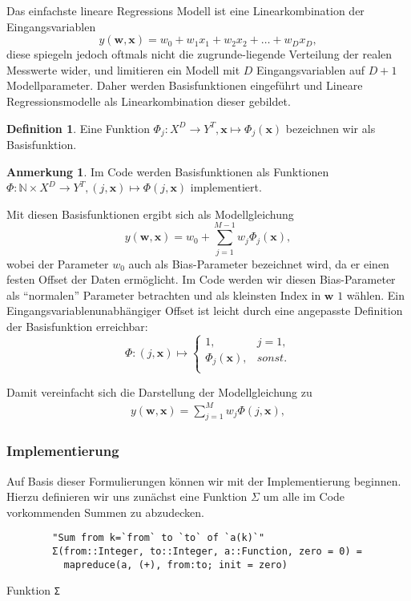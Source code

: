 \documentclass{article}
\theoremstyle{plain} %
\theoremstyle{definition} %
\newtheorem{definition}[theorem]{Definition}
\newtheorem{anno}[theorem]{Anmerkung}
\begin{document}
Das einfachste lineare Regressions Modell ist eine Linearkombination der Eingangsvariablen 
$$
  y(\mathbf{w}, \mathbf{x}) = w_0 + w_1x_1 + w_2x_2 + \hdots + w_Dx_D,
$$
diese spiegeln jedoch oftmals nicht die zugrunde-liegende Verteilung der realen Messwerte wider, und limitieren ein Modell mit $D$ Eingangsvariablen auf $D+1$ Modellparameter. Daher werden Basisfunktionen eingeführt und Lineare Regressionsmodelle als Linearkombination dieser gebildet.
\begin{definition}
  Eine Funktion $\Phi_j: X^D \rightarrow Y^T, \mathbf{x} \mapsto \Phi_j(\mathbf{x})$ bezeichnen wir als Basisfunktion.
\end{definition}
\begin{anno}
  Im Code werden Basisfunktionen als Funktionen $\Phi: \mathbb{N} \times X^D \rightarrow Y^T, (j, \mathbf{x}) \mapsto \Phi(j, \mathbf{x})$ implementiert.
\end{anno}

Mit diesen Basisfunktionen ergibt sich als Modellgleichung
$$
  y(\mathbf{w}, \mathbf{x}) = w_0 + \sum_{j=1}^{M-1}w_j\Phi_j(\mathbf{x}),
$$
wobei der Parameter $w_0$ auch als Bias-Parameter bezeichnet wird, da er einen festen Offset der Daten ermöglicht. Im Code werden wir diesen Bias-Parameter als ``normalen'' Parameter betrachten und als kleinsten Index in $\mathbf{w}$ $1$ wählen. Ein Eingangsvariablenunabhängiger Offset ist leicht durch eine angepasste Definition der Basisfunktion erreichbar:
\[ \Phi: (j, \mathbf{x}) \mapsto
 \left\{
  \begin{array}{ll}
    1,& j=1, \\
    \Phi_j(\mathbf{x}), & sonst. \\  
  \end{array}
\right. \]

Damit vereinfacht sich die Darstellung der Modellgleichung zu
\begin{align}
  y(\mathbf{w}, \mathbf{x}) = \sum_{j=1}^{M}w_j\Phi(j, \mathbf{x}), \label{y}
\end{align}

\subsubsection{Implementierung}
Auf Basis dieser Formulierungen können wir mit der Implementierung beginnen.
Hierzu definieren wir uns zunächst eine Funktion \texttt{$\Sigma$} um alle im Code vorkommenden Summen zu abzudecken.

\begin{listing}[!ht]
    \begin{verbatim}
        "Sum from k=`from` to `to` of `a(k)`"
        Σ(from::Integer, to::Integer, a::Function, zero = 0) =
          mapreduce(a, (+), from:to; init = zero)
    \end{verbatim}
    \caption{Funktion \texttt{Σ}}
\end{listing}
\end{document}
